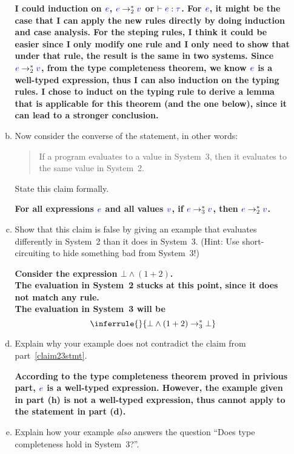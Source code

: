 \documentclass{article}
\newcommand{\meta}[1]{{\color{blue}#1}}
\begin{document}
\begin{enumerate}[leftmargin=*,itemindent=*,start=6,label={{\bf Problem \arabic*}.},ref=\arabic*]
\begin{enumerate}[(a)]
    \textbf{I could induction on $\meta{e}$, $\meta{e} \to_2^* \meta{v}$ or $\vdash \meta{e} : \meta{\tau}$. For $\meta{e}$, it might be the case that I can apply the new rules directly by doing induction and case analysis. For the steping rules, I think it could be easier since I only modify one rule and I only need to show that under that rule, the result is the same in two systems. Since $\meta{e} \to_2^* \meta{v}$, from the type completeness theorem, we know $\meta{e}$ is a well-typed expression, thus I can also induction on the typing rules. I chose to induct on the typing rule to derive a lemma that is applicable for this theorem (and the one below), since it can lead to a stronger conclusion.
    } 

  \item\label{claim32stmt} Now consider the converse of the statement, in other words:
    \begin{quote}
      If a program evaluates to a value in System~3, then it evaluates to the same value in System~2.
    \end{quote}
    State this claim formally.

    \textbf {
      For all expressions $\meta{e}$ and all values $\meta{v}$, if $\meta{e} \to_3^* \meta{v}$, then $\meta{e} \to_2^* \meta{v}$.
    }
  \item Show that this claim is false by giving an example that evaluates differently in System~2 than
    it does in System~3. (Hint: Use short-circuiting to hide something bad from System~3!)

    \textbf {
      Consider the expression $\bot \wedge (1 + 2)$. \\
      The evaluation in System~2 stucks at this point, since it does not match any rule. \\
      The evaluation in System~3 will be $$
        \inferrule{ }{\bot \wedge (1 + 2) \to_3^* \bot}$$
    }


  \item Explain why your example does not contradict the claim from part~\ref{claim23stmt}.
  
    \textbf {
      According to the type completeness theorem proved in privious part, $\meta{e}$ is a well-typed expression. However, the example given in part (h) is not a well-typed expression, thus cannot apply to the statement in part (d).
    }

  \item Explain how your example \emph{also} answers the question ``Does type completeness hold in System~3?''.
    

\end{enumerate}
\end{enumerate}
\end{document}

